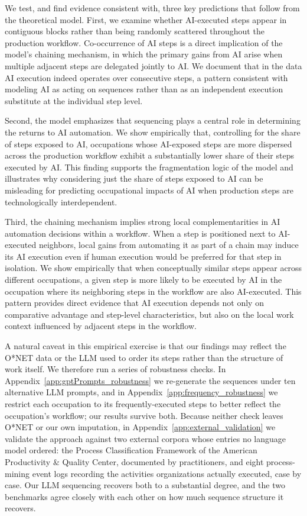 We test, and find evidence consistent with, three key predictions that follow from the theoretical model.
First, we examine whether AI-executed steps appear in contiguous blocks rather than being randomly scattered throughout the production workflow.
Co-occurrence of AI steps is a direct implication of the model's chaining mechanism, in which the primary gains from AI arise when multiple adjacent steps are delegated jointly to AI.
We document that in the data AI execution indeed operates over consecutive steps, a pattern consistent with modeling AI as acting on sequences rather than as an independent execution substitute at the individual step level.

Second, the model emphasizes that sequencing plays a central role in determining the returns to AI automation.
We show empirically that, controlling for the share of steps exposed to AI, occupations whose AI-exposed steps are more dispersed across the production workflow exhibit a substantially lower share of their steps executed by AI.
This finding supports the fragmentation logic of the model and illustrates why considering just the share of steps exposed to AI can be misleading for predicting occupational impacts of AI when production steps are technologically interdependent.

Third, the chaining mechanism implies strong local complementarities in AI automation decisions within a workflow.
When a step is positioned next to AI-executed neighbors, local gains from automating it as part of a chain may induce its AI execution even if human execution would be preferred for that step in isolation.
We show empirically that when conceptually similar steps appear across different occupations, a given step is more likely to be executed by AI in the occupation where its neighboring steps in the workflow are also AI-executed.
This pattern provides direct evidence that AI execution depends not only on comparative advantage and step-level characteristics, but also on the local work context influenced by adjacent steps in the workflow.

A natural caveat in this empirical exercise is that our findings may reflect the O*NET data or the LLM used to order its steps rather than the structure of work itself.
We therefore run a series of robustness checks.
In Appendix~\ref{app:gptPrompts_robustness} we re-generate the sequences under ten alternative LLM prompts, and in Appendix~\ref{app:frequency_robustness} we restrict each occupation to its frequently-executed steps to better reflect the occupation's workflow; our results survive both.
Because neither check leaves O*NET or our own imputation, in Appendix~\ref{app:external_validation} we validate the approach against two external corpora whose entries no language model ordered: the Process Classification Framework of the American Productivity \& Quality Center, documented by practitioners, and eight process-mining event logs recording the activities organizations actually executed, case by case. Our LLM sequencing recovers both to a substantial degree, and the two benchmarks agree closely with each other on how much sequence structure it recovers.